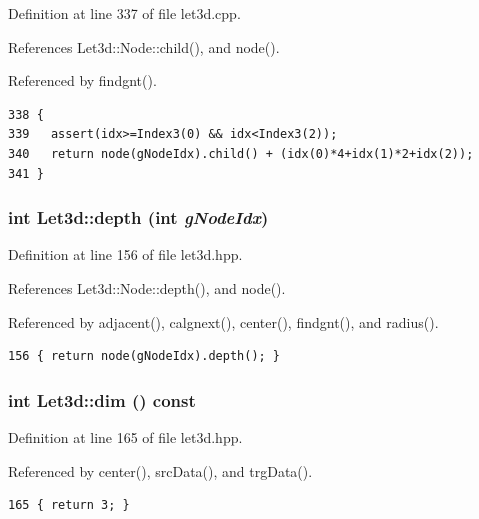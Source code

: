 Definition at line 337 of file let3d.cpp.

References Let3d::Node::child(), and node().

Referenced by findgnt().

\footnotesize\begin{verbatim}338 {
339   assert(idx>=Index3(0) && idx<Index3(2));
340   return node(gNodeIdx).child() + (idx(0)*4+idx(1)*2+idx(2));
341 }
\end{verbatim}\normalsize 


\subsubsection{\setlength{\rightskip}{0pt plus 5cm}int Let3d::depth (int {\em g\-Node\-Idx})\hspace{0.3cm}{\tt  [inline]}}\label{classLet3d_365114de1453e803d05b02702d1e0bc2_365114de1453e803d05b02702d1e0bc2}




Definition at line 156 of file let3d.hpp.

References Let3d::Node::depth(), and node().

Referenced by adjacent(), calgnext(), center(), findgnt(), and radius().

\footnotesize\begin{verbatim}156 { return node(gNodeIdx).depth(); }
\end{verbatim}\normalsize 


\subsubsection{\setlength{\rightskip}{0pt plus 5cm}int Let3d::dim () const\hspace{0.3cm}{\tt  [inline]}}\label{classLet3d_3b54adb16617f4dccdd399f842f3f6bf_3b54adb16617f4dccdd399f842f3f6bf}




Definition at line 165 of file let3d.hpp.

Referenced by center(), src\-Data(), and trg\-Data().

\footnotesize\begin{verbatim}165 { return 3; }  
\end{verbatim}\normalsize 


